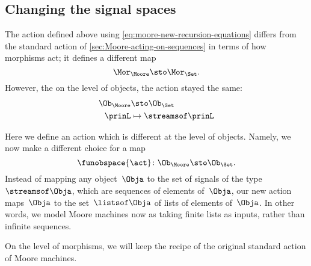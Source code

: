 
\subsection{Changing the signal spaces}

The action defined above using \cref{eq:moore-new-recursion-equations} differs from the standard action of \cref{sec:Moore-acting-on-sequences} in terms of how morphisms act; it defines a different map
\begin{equation}
    \Mor_\Moore \sto \Mor_\Set.
\end{equation}
However, the on the level of objects, the action stayed the same:
\begin{equation}
    \begin{aligned}
        \Ob_{\Moore} & \sto \Ob_{\Set} \\
        \prinL       & \mapsto \streamsof\prinL
    \end{aligned}
\end{equation}

Here we define an action which is different at the level of objects.
Namely, we now make a different choice for a map
\begin{equation}
    \funobspace{\act} \colon \Ob_{\Moore} \sto \Ob_{\Set}.
\end{equation}
Instead of mapping any object~$\Obja$ to the set of signals of the type~$\streamsof\Obja$, which are sequences of elements of~$\Obja$, our new action maps~$\Obja$ to the set~$\listsof\Obja$ of lists of elements of~$\Obja$.
In other words, we model Moore machines now as taking finite lists as inputs, rather than infinite sequences.

On the level of morphisms, we will keep the recipe of the original standard action of Moore machines.

